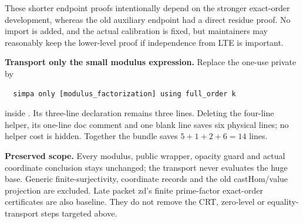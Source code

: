 These shorter endpoint proofs intentionally depend on the stronger exact-order development, whereas the old auxiliary endpoint had a direct residue proof. No import is added, and the actual calibration is fixed, but maintainers may reasonably keep the lower-level proof if independence from LTE is important.

\textbf{Transport only the small modulus expression.} Replace the one-use private  by
\begin{lstlisting}
  simpa only [modulus_factorization] using full_order k
\end{lstlisting}
inside . Its three-line declaration remains three lines. Deleting the four-line helper, its one-line doc comment and one blank line saves six physical lines; no helper cost is hidden. Together the bundle saves $5+1+2+6=14$ lines.

\textbf{Preserved scope.} Every modulus, public wrapper, opacity guard and actual coordinate conclusion stays unchanged; the transport never evaluates the huge base. Generic finite-surjectivity, coordinate records and the old castHom/value projection are excluded. Late packet zd's finite prime-factor exact-order certificates are also baseline. They do not remove the CRT, zero-level or equality-transport steps targeted above.
